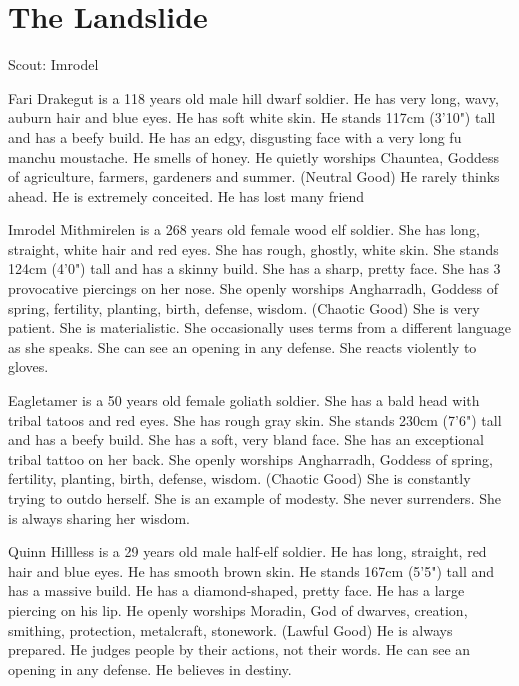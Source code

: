 \section{The Landslide}

Scout: Imrodel



Fari Drakegut is a 118 years old male hill dwarf soldier.
He has very long, wavy, auburn hair and blue eyes.
He has soft white skin.
He stands 117cm (3'10") tall and has a beefy build.
He has an edgy, disgusting face with a very long fu manchu moustache.
He smells of honey.
He quietly worships Chauntea, Goddess of agriculture, farmers, gardeners and summer. (Neutral Good)
He rarely thinks ahead.
He is extremely conceited.
He has lost many friend

Imrodel Mithmirelen is a 268 years old female wood elf soldier.
She has long, straight, white hair and red eyes.
She has rough, ghostly, white skin.
She stands 124cm (4'0") tall and has a skinny build.
She has a sharp, pretty face.
She has 3 provocative piercings on her nose.
She openly worships Angharradh, Goddess of spring, fertility, planting, birth, defense, wisdom. (Chaotic Good)
She is very patient.
She is materialistic.
She occasionally uses terms from a different language as she speaks.
She can see an opening in any defense.
She reacts violently to gloves.

Eagletamer is a 50 years old female goliath soldier.
She has a bald head with tribal tatoos and red eyes.
She has rough gray skin.
She stands 230cm (7'6") tall and has a beefy build.
She has a soft, very bland face.
She has an exceptional tribal tattoo on her back.
She openly worships Angharradh, Goddess of spring, fertility, planting, birth, defense, wisdom. (Chaotic Good)
She is constantly trying to outdo herself.
She is an example of modesty.
She never surrenders.
She is always sharing her wisdom.

Quinn Hillless is a 29 years old male half-elf soldier.
He has long, straight, red hair and blue eyes.
He has smooth brown skin.
He stands 167cm (5'5") tall and has a massive build.
He has a diamond-shaped, pretty face.
He has a large piercing on his lip.
He openly worships Moradin, God of dwarves, creation, smithing, protection, metalcraft, stonework. (Lawful Good)
He is always prepared.
He judges people by their actions, not their words.
He can see an opening in any defense.
He believes in destiny.
